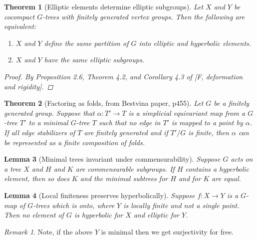 \documentclass{article}
\theoremstyle{mystyle}
\newtheorem{thm}{Theorem}[section]
\newtheorem{lem}[thm]{Lemma}
\theoremstyle{remark}
\newtheorem{rmk}{Remark}[section]
\begin{document}
\begin{thm}
    [Elliptic elements determine elliptic subgroups]
    \label{thm:ellelesubgroups} 
    Let \(X\) and \(Y\) be cocompact \(G\)-trees with finitely generated vertex groups. Then the following are equivalent:
    \begin{enumerate}
        \item \(X\) and \(Y\) define the same partition of \(G\) into elliptic and hyperbolic elements.
        \item \(X\) and \(Y\) have the same elliptic subgroups.
    \end{enumerate}

    \begin{proof}
    By Proposition 2.6, Theorem 4.2, and Corollary 4.3 of [F, deformation and rigidity].
    \end{proof}
    
\end{thm}

\begin{thm}[Factoring as folds, from Bestvina paper, p455]
    \label{thm:folds} 
Let $G$ be a finitely generated group. Suppose that $\alpha: T'\to T$ is a simplicial equivariant map from a $G$-tree $T'$ to a minimal $G$-tree $T$ such that no edge in $T'$ is mapped to a point by $\alpha$. If all edge stabilizers of $T$ are finitely generated and if $T'/G$ is finite, then $\alpha$ can be represented as a finite composition of folds.
\end{thm}

\begin{lem}
    [Minimal trees invariant under commensurability]
    \label{lem:commensurableminimal} 
    Suppose \(G\) acts on a tree \(X\) and \(H\) and \(K\) are commensurable subgroups. If \(H\) contains a hyperbolic element, then so does \(K\) and the minimal subtrees for \(H\) and for \(K\) are equal.
\end{lem}

\begin{lem}
    [Local finiteness preserves hyperbolically]
    \label{lem:localfinhyper} 
    Suppose \(f:X \to Y\) is a \(G\)-map of \(G\)-trees which is onto, where \(Y\) is locally finite and not a single point. Then no element of \(G\) is hyperbolic for \(X\) and elliptic for \(Y\).
\end{lem}

\begin{rmk}
    Note, if the above \(Y\) is minimal then we get surjectivity for free.
\end{rmk}
\end{document}
